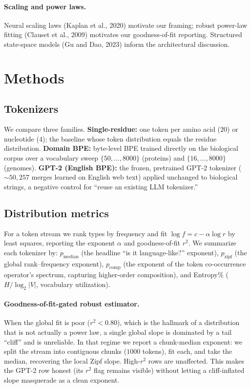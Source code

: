 \documentclass[11pt]{article}
\begin{document}
\paragraph{Scaling and power laws.} Neural scaling laws (Kaplan et al., 2020)
motivate our framing; robust power-law fitting (Clauset et al., 2009) motivates
our goodness-of-fit reporting. Structured state-space models (Gu and Dao, 2023)
inform the architectural discussion.

\section{Methods}
\subsection{Tokenizers}
We compare three families. \textbf{Single-residue:} one token per amino acid
($20$) or nucleotide ($4$); the baseline whose token distribution equals the
residue distribution. \textbf{Domain BPE:} byte-level BPE trained directly on
the biological corpus over a vocabulary sweep $\{50,\ldots,8000\}$ (proteins)
and $\{16,\ldots,8000\}$ (genomes). \textbf{GPT-2 (English BPE):} the frozen,
pretrained GPT-2 tokenizer (${\sim}50{,}257$ merges learned on English web text)
applied unchanged to biological strings, a negative control for ``reuse an
existing LLM tokenizer.''

\subsection{Distribution metrics}
For a token stream we rank types by frequency and fit $\log f = c - \alpha \log
r$ by least squares, reporting the exponent $\alpha$ and goodness-of-fit $r^2$.
We summarize each tokenizer by: $p_\text{median}$ (the headline ``is it
language-like?'' exponent), $p_\text{zipf}$ (the global rank--frequency
exponent), $p_\text{comp}$ (the exponent of the token co-occurrence operator's
spectrum, capturing higher-order composition), and Entropy\% ($H/\log_2|V|$,
vocabulary utilization).

\paragraph{Goodness-of-fit-gated robust estimator.} When the global fit is poor
($r^2 < 0.80$), which is the hallmark of a distribution that is not actually a
power law, a single global slope is dominated by a tail ``cliff'' and is
unreliable. In that regime we report a chunk-median exponent: we split the
stream into contiguous chunks ($1000$ tokens), fit each, and take the median,
recovering the local Zipf slope. High-$r^2$ rows are unaffected. This makes the
GPT-2 row honest (its $r^2$ flag remains visible) without letting a
cliff-inflated slope masquerade as a clean exponent.
\end{document}
